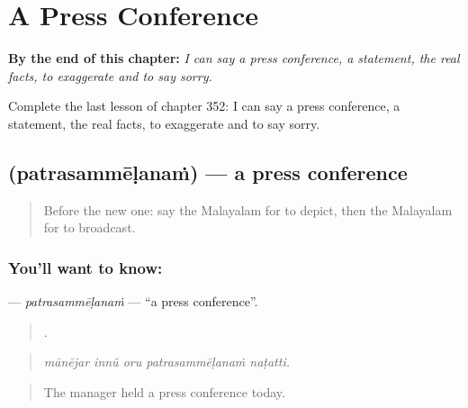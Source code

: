 
\chapter{A Press Conference}
\label{ch:ml-a-press-conference}

\begin{chapteropening}
\textbf{By the end of this chapter:} \emph{I can say a press conference, a statement, the real facts, to exaggerate and to say sorry.}

Complete the last lesson of chapter 352: I can say a press conference, a statement, the real facts, to exaggerate and to say sorry.
\end{chapteropening}

\section[\texorpdfstring{\ml{പത്രസമ്മേളനം} (patrasammēḷanaṁ)}{പത്രസമ്മേളനം (patrasammēḷanaṁ)}]{ (patrasammēḷanaṁ) — a press conference}

\label{lesson:ML-C352-patrasammelanam}



\begin{quote}
Before the new one: say the Malayalam for to depict, then the Malayalam for to broadcast.
\end{quote}

\subsection*{You'll want to know: }
\textbf{} — \emph{patrasammēḷanaṁ} — \textquotedblleft{}a press conference\textquotedblright{}.

\begin{quote}
    .
\end{quote}

\begin{quote}
\emph{mānējar innŭ oru patrasammēḷanaṁ naṭatti.}
\end{quote}

\begin{quote}
The manager held a press conference today.
\end{quote}

